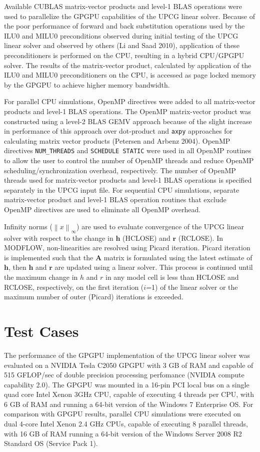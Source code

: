 \documentclass[12pt]{article}
\begin{document}
Available CUBLAS matrix-vector products and level-1 BLAS operations were used to parallelize the GPGPU capabilities of the UPCG linear solver. Because of the poor performance of forward and back substitution operations used by the ILU0 and MILU0 preconditions observed during initial testing of the UPCG linear solver and observed by others (Li and Saad 2010), application of these preconditioners is performed on the CPU, resulting in a hybrid CPU/GPGPU solver. The results of the matrix-vector product, calculated by application of the ILU0 and MILU0 preconditioners on the CPU, is accessed as page locked memory by the GPGPU to achieve higher memory bandwidth.

For parallel CPU simulations, OpenMP directives were added to all matrix-vector products and level-1 BLAS operations. The OpenMP matrix-vector product was constructed using a level-2 BLAS GEMV approach because of the slight increase in performance of this approach over dot-product and \texttt{axpy} approaches for calculating matrix vector products (Petersen and Arbenz 2004). OpenMP directives \texttt{NUM\_THREADS} and \texttt{SCHEDULE STATIC} were used in all OpenMP routines to allow the user to control the number of OpenMP threads and reduce OpenMP scheduling/synchronization overhead, respectively. The number of OpenMP threads used for matrix-vector products and level-1 BLAS operations is specified separately in the UPCG input file. For sequential CPU simulations,  separate matrix-vector product and level-1 BLAS operation routines that exclude OpenMP directives are used to eliminate all OpenMP overhead.

Infinity norms ($\left \|  x \right \|_{\infty}$) are used to evaluate convergence of the UPCG linear solver with respect to the change in $\mathbf{h}$ (HCLOSE) and $\mathbf{r}$ (RCLOSE). In MODFLOW, non-linearities are resolved using Picard iteration. Picard iteration is implemented such that the $\mathbf{A}$ matrix is formulated using the latest estimate of $\mathbf{h}$, then $\mathbf{h}$ and $\mathbf{r}$ are updated using a linear solver. This process is continued until the maximum change in $h$ and $r$ in any model cell is less than HCLOSE and RCLOSE, respectively, on the first iteration ($i$=1) of the linear solver or the maximum number of outer (Picard) iterations is exceeded. \\


\section* {\bf Test Cases}
The performance of the GPGPU implementation of the UPCG linear solver was evaluated on a NVIDIA Tesla C2050 GPGPU with 3 GB of RAM and capable of 515 GFLOP/sec of double precision processing perfomance (NVIDIA compute capability 2.0). The GPGPU was mounted in a 16-pin PCI local bus on a single quad core Intel Xenon 3GHz CPU, capable of executing 4 threads per CPU, with 6 GB of RAM and running a 64-bit version of the Windows 7 Enterprise OS. For comparison with GPGPU results, parallel CPU simulations were executed on dual 4-core Intel Xenon 2.4 GHz CPUs, capable of executing 8 parallel threads, with 16 GB of RAM running a 64-bit version of the Windows Server 2008 R2 Standard OS (Service Pack 1).
\end{document}
